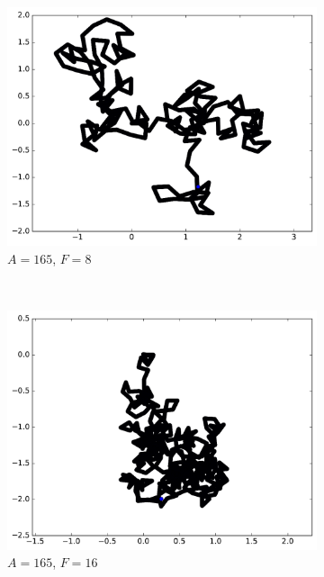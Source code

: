 \begin{figure}[htb]
\begin{subfigure}[t]{\subImgWmo}
			\centering
			\includegraphics[width=\textwidth]{figures/ch3/synTraj_219_165_8}
			\caption[$A = 165$, $F=8$]{$A = 165$, $F=8$}
			\label{fig:synTraj_219_165_8}
		\end{subfigure}
		~
		\begin{subfigure}[t]{\subImgWmo}
			\centering
			\includegraphics[width=\textwidth]{figures/ch3/synTraj_219_165_16}
			\caption[$A = 165$, $F=16$]{$A = 165$, $F=16$}
			\label{fig:synTraj_219_165_16}
		\end{subfigure}
		~
		\begin{subfigure}[t]{\subImgWmo}
			\centering

\end{subfigure}
\end{figure}
